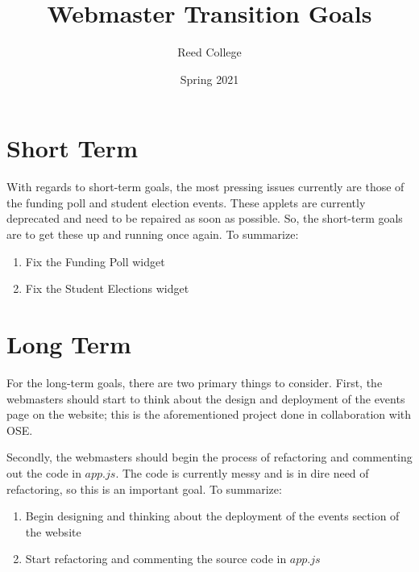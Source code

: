 \documentclass[a4paper]{article}
\title{Webmaster Transition Goals}
\author{Reed College}
\date{Spring 2021}
\begin{document}
\maketitle

\section{Short Term}
With regards to short-term goals, the most pressing issues currently are those of the funding poll and student election events. These applets are currently deprecated and need to be repaired as soon as possible. So, the short-term goals are to get these up and running once again. To summarize:

\begin{enumerate}
  \item Fix the Funding Poll widget
  \item Fix the Student Elections widget
\end{enumerate}

\section{Long Term}
For the long-term goals, there are two primary things to consider. First, the webmasters should start to think about the design and deployment of the events page on the website; this is the aforementioned project done in collaboration with OSE.

Secondly, the webmasters should begin the process of refactoring and commenting out the code in $app.js$. The code is currently messy and is in dire need of refactoring, so this is an important goal. To summarize:

\begin{enumerate}
  \item Begin designing and thinking about the deployment of the events section of the website
  \item Start refactoring and commenting the source code in $app.js$
\end{enumerate}
\end{document}
